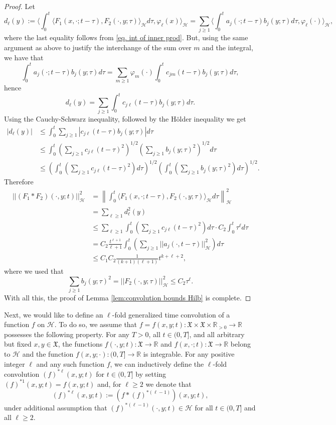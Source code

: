 \documentclass[11pt,reqno]{amsart}
\theoremstyle{remark}
\theoremstyle{definition}
\numberwithin{theorem}{section} \numberwithin{equation}{section}
\newcommand{\X}{\mathfrak{X}}
\begin{document}
\begin{proof}
Let
$$
d_{\ell}(y):=\langle \int_0^t
\langle F_1(x,\cdot;t-\tau),F_2(\cdot,y;\tau)  \rangle_{\mathcal{H}} d\tau, \varphi_\ell (x)\rangle_{\mathcal{H}}= \sum_{j\geq 1} \langle  \int_0^t  a_j(\cdot;t-\tau)b_j(y;\tau) d\tau ,  \varphi_\ell(\cdot) \rangle_{\mathcal{H}},
$$
where the last equality follows from \eqref{eq. int of inner prod}.
But, using the same argument as above to justify the interchange of the sum over $m$ and the integral, we have that
$$
\int_0^t  a_j(\cdot;t-\tau)b_j(y;\tau) d\tau = \sum_{m\geq 1} \varphi_m(\cdot) \int_0^t  c_{jm}(t-\tau)b_j(y;\tau) d\tau,
$$
hence
$$
d_{\ell}(y)=\sum_{j\geq 1}  \int_0^t  c_{j\ell}(t-\tau)b_j(y;\tau) d\tau.
$$
Using the Cauchy-Schwarz inequality, followed by the H\"older inequality we get
\begin{align*}
|d_\ell(y)|&\leq \int_0^t \sum_{j\geq 1}  |c_{j\ell}(t-\tau)b_j(y;\tau)| d\tau\\
&\leq \int_0^t \left(\sum_{j\geq 1}c_{j\ell}(t-\tau)^2 \right)^{1/2} \left(\sum_{j\geq 1} b_j(y;\tau)^2 \right)^{1/2} d\tau\\
&\leq \left( \int_0^t \left(\sum_{j\geq 1}c_{j\ell}(t-\tau)^2 \right)d\tau\right)^{1/2}
 \left( \int_0^t \left(\sum_{j\geq 1}b_j(y;\tau)^2 \right)d\tau\right)^{1/2}.
\end{align*}
Therefore
\begin{align*}
||(F_{1}\ast F_{2})(\cdot,y;t)||_{\mathcal{H}}^2 &=  \left\| \int_0^t
\langle F_1(x,\cdot;t-\tau),F_2(\cdot,y;\tau)  \rangle_{\mathcal{H}} d\tau\right\|_{\mathcal{H}}^2 \\&=\sum_{\ell\geq 1} d_\ell^2(y)
\\ &\leq \sum_{\ell\geq 1} \int_0^t \left(\sum_{j\geq 1}c_{j\ell}(t-\tau)^2 \right)d\tau \cdot C_2  \int_0^t \tau^\ell d\tau \\&= C_2\frac{t^{\ell+1}}{\ell+1}  \int_0^t \left( \sum_{j\geq 1} ||a_j(\cdot,t-\tau)||^2_{\mathcal{H}}\right) d\tau \\&\leq C_{1}C_{2}\frac{1}{(k+1)(\ell+1)}   t^{k+\ell+2},
\end{align*}
where we used that
$$
\sum_{j\geq 1}b_j(y;\tau)^2 =||F_2(\cdot,y;\tau)||_\mathcal{H}^2\leq C_2\tau^\ell.
$$
With all this, the proof of Lemma \ref{lem:convolution bounds Hilb} is complete.
\end{proof}

Next, we would like to define an $\ell$-fold generalized time convolution of a function $f$ on $\mathcal{H}$.
To do so, we assume that $f=f(x,y;t):\X\times \X\times\mathbb{R}_{>0}\to\mathbb{R}$ possesses the following property.  For any  $T>0$, all $t\in (0,T]$,
and all arbitrary but fixed $x,y\in \X$, the functions $f(\cdot, y;t): \X \to \mathbb{R} $ and $f(x,\cdot;t): \X \to \mathbb{R} $
belong to $\mathcal{H}$ and the function $f(x,y;\cdot) :(0,T] \to \mathbb{R}$ is integrable.
For any positive integer $\ell$ and any such function $f$, we can inductively define the $\ell$-fold
convolution $(f)^{\ast\ell}(x,y;t)$ for $t\in(0,T]$ by setting $(f)^{\ast1}(x,y;t)=f(x,y;t)$
and, for $\ell\geq2$ we denote that
$$
(f)^{\ast\ell}(x,y;t):=\left(f\ast(f)^{\ast(\ell-1)}\right)(x,y;t),
$$
under additional assumption that $(f)^{\ast(\ell-1)}(\cdot,y;t)\in \mathcal{H}$ for all $t\in(0,T]$ and all $\ell \geq 2$.
\end{document}
